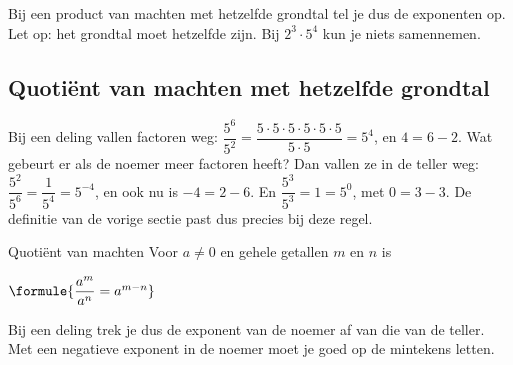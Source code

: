 Bij een product van machten met hetzelfde grondtal tel je dus de exponenten op. Let op: het grondtal moet hetzelfde zijn. Bij $2^3 \cdot 5^4$ kun je niets samennemen.


\begin{oefeningen}
\end{oefeningen}

\subsection{Quotiënt van machten met hetzelfde grondtal}

Bij een deling vallen factoren weg: $\dfrac{5^6}{5^2} = \dfrac{5 \cdot 5 \cdot 5 \cdot 5 \cdot 5 \cdot 5}{5 \cdot 5} = 5^4$, en $4 = 6 - 2$. Wat gebeurt er als de noemer meer factoren heeft? Dan vallen ze in de teller weg: $\dfrac{5^2}{5^6} = \dfrac{1}{5^4} = 5^{-4}$, en ook nu is $-4 = 2 - 6$. En $\dfrac{5^3}{5^3} = 1 = 5^0$, met $0 = 3 - 3$. De definitie van de vorige sectie past dus precies bij deze regel.

\begin{theorie}
\begin{stelling}{Quotiënt van machten}
Voor $a \neq 0$ en gehele getallen $m$ en $n$ is

\vspace{1mm}
\qquad $\formule{\dfrac{a^m}{a^n} = a^{m-n}}$
\end{stelling}
\end{theorie}

Bij een deling trek je dus de exponent van de noemer af van die van de teller. Met een negatieve exponent in de noemer moet je goed op de mintekens letten.


